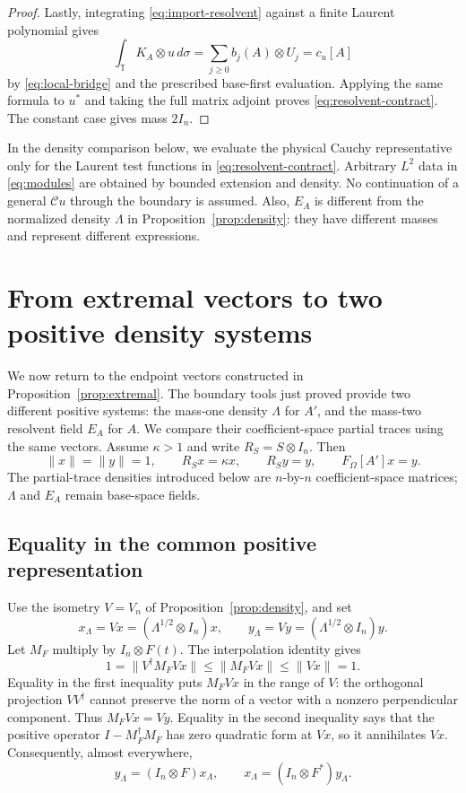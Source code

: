 \documentclass[11pt]{article}
\newcommand{\T}{\mathbb T}
\newcommand{\cC}{\mathcal C}
\theoremstyle{definition}
\theoremstyle{remark}
\numberwithin{equation}{section}
\begin{document}
\begin{proof}
Lastly, integrating \eqref{eq:import-resolvent} against a finite Laurent
polynomial gives
\[
 \int_\T K_A\otimes u\,d\sigma
 =\sum_{j\ge0}b_j(A)\otimes U_j=c_u[A]
\]
by \eqref{eq:local-bridge} and the prescribed base-first evaluation.
Applying the same formula to $u^*$ and taking the full matrix adjoint
proves \eqref{eq:resolvent-contract}. The constant case gives mass $2I_n$.
\end{proof}

In the density comparison below, we evaluate the physical Cauchy
representative only for the Laurent test functions in
\eqref{eq:resolvent-contract}. Arbitrary $L^2$ data
in \eqref{eq:modules} are obtained by bounded extension and density.
No continuation of a general $\cC u$ through the boundary is assumed.
Also, $E_A$ is different from the normalized density $\Lambda$ in
Proposition~\ref{prop:density}:
they have different masses and represent different expressions.

\section{From extremal vectors to two positive density systems}\label{sec:bridge}
We now return to the endpoint vectors constructed in
Proposition~\ref{prop:extremal}. The boundary tools just proved provide
two different positive systems: the mass-one density $\Lambda$ for $A'$,
and the mass-two resolvent field $E_A$ for $A$. We compare their
coefficient-space partial traces using the same vectors.
Assume $\kappa>1$ and write
$R_S=S\otimes I_n$. Then
\begin{equation}\label{eq:endpoints}
 \|x\|=\|y\|=1,\qquad R_Sx=\kappa x,\qquad R_Sy=y,
 \qquad F_\Omega[A']x=y.
\end{equation}
The partial-trace densities introduced below are $n$-by-$n$
coefficient-space matrices; $\Lambda$ and $E_A$ remain base-space fields.

\subsection{Equality in the common positive representation}
Use the isometry $V=V_n$ of Proposition~\ref{prop:density}, and set
\[
 x_\Lambda=Vx=(\Lambda^{1/2}\otimes I_n)x,\qquad
 y_\Lambda=Vy=(\Lambda^{1/2}\otimes I_n)y.
\]
Let $M_F$ multiply by $I_n\otimes F(t)$. The interpolation identity gives
\[
 1=\|V^\dagger M_FVx\|\le\|M_FVx\|\le\|Vx\|=1.
\]
Equality in the first inequality puts $M_FVx$ in the range of $V$:
the orthogonal projection $VV^\dagger$ cannot preserve the norm of a
vector with a nonzero perpendicular component. Thus $M_FVx=Vy$.
Equality in the second inequality says that the positive operator
$I-M_F^\dagger M_F$ has zero quadratic form at $Vx$, so it annihilates
$Vx$. Consequently, almost everywhere,
\begin{equation}\label{eq:fiber-equality}
 y_\Lambda=(I_n\otimes F)x_\Lambda,\qquad
 x_\Lambda=(I_n\otimes F^*)y_\Lambda.
\end{equation}
\end{document}
